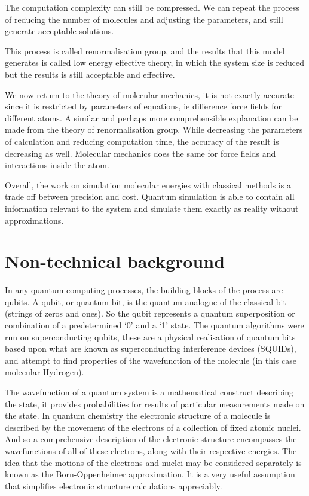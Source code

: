 \documentclass[12pt]{article}
\begin{document}
The computation complexity can still be compressed. We can repeat the process of reducing the number of molecules and adjusting the parameters, and still generate acceptable solutions. 

This process is called renormalisation group, and the results that this model generates is called low energy effective theory, in which the system size is reduced but the results is still acceptable and effective. 

We now return to the theory of molecular mechanics, it is not exactly accurate since it is restricted by parameters of equations, ie difference force fields for different atoms. A similar and perhaps more comprehensible explanation can be made from the theory of renormalisation group. While decreasing the parameters of calculation and reducing computation time, the accuracy of the result is decreasing as well. Molecular mechanics does the same for force fields and interactions inside the atom. 

Overall, the work on simulation molecular energies with classical methods is a trade off between precision and cost. Quantum simulation is able to contain all information relevant to the system and simulate them exactly as reality without approximations.


\section{Non-technical background}
In any quantum computing processes, the building blocks of the process are qubits. A qubit, or quantum bit, is the quantum analogue of the classical bit (strings of zeros and ones). So the qubit represents a quantum superposition or combination of a predetermined ‘0’ and a ‘1’ state. The quantum algorithms were run on superconducting qubits, these are a physical realisation of quantum bits based upon what are known as superconducting interference devices (SQUIDs), and attempt to find properties of the wavefunction of the molecule (in this case molecular Hydrogen).

The wavefunction of a quantum system is a mathematical construct describing the state, it provides probabilities for results of particular measurements made on the state. In quantum chemistry the electronic structure of a molecule is described by the movement of the electrons of a collection of fixed atomic nuclei. And so a comprehensive description of the electronic structure encompasses the wavefunctions of all of these electrons, along with their respective energies. The idea that the motions of the electrons and nuclei may be considered separately is known as the Born-Oppenheimer approximation. It is a very useful assumption that simplifies electronic structure calculations appreciably. 
\end{document}
